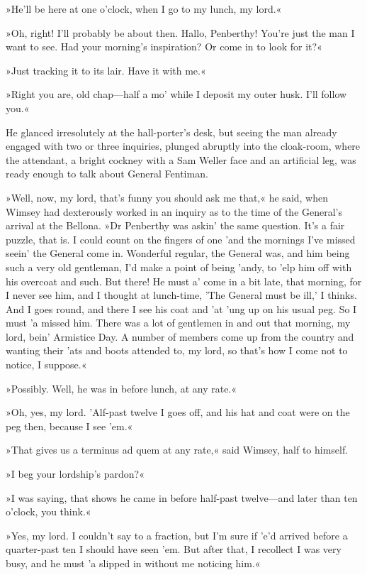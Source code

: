 »He'll be here at one o'clock, when I go to my lunch, my lord.«

»Oh, right! I'll probably be about then. Hallo, Penberthy! You're just the man I want to see. Had your morning's inspiration? Or come in to look for it?«

»Just tracking it to its lair. Have it with me.«

»Right you are, old chap\allowbreak---\allowbreak half a mo' while I deposit my outer husk. I'll follow you.«

He glanced irresolutely at the hall-porter's desk, but seeing the man already engaged with two or three inquiries, plunged abruptly into the cloak-room, where the attendant, a bright cockney with a Sam Weller face and an artificial leg, was ready enough to talk about General Fentiman.

»Well, now, my lord, that's funny you should ask me that,« he said, when Wimsey had dexterously worked in an inquiry as to the time of the General's arrival at the Bellona. »Dr Penberthy was askin' the same question. It's a fair puzzle, that is. I could count on the fingers of one 'and the mornings I've missed seein' the General come in. Wonderful regular, the General was, and him being such a very old gentleman, I'd make a point of being 'andy, to 'elp him off with his overcoat and such. But there! He must a' come in a bit late, that morning, for I never see him, and I thought at lunch-time, 'The General must be ill,' I thinks. And I goes round, and there I see his coat and 'at 'ung up on his usual peg. So I must 'a missed him. There was a lot of gentlemen in and out that morning, my lord, bein' Armistice Day. A number of members come up from the country and wanting their 'ats and boots attended to, my lord, so that's how I come not to notice, I suppose.«

»Possibly. Well, he was in before lunch, at any rate.«

»Oh, yes, my lord. 'Alf-past twelve I goes off, and his hat and coat were on the peg then, because I see 'em.«

»That gives us a terminus ad quem at any rate,« said Wimsey, half to himself.

»I beg your lordship's pardon?«

»I was saying, that shows he came in before half-past twelve\allowbreak---\allowbreak and later than ten o'clock, you think.«

»Yes, my lord. I couldn't say to a fraction, but I'm sure if 'e'd arrived before a quarter-past ten I should have seen 'em. But after that, I recollect I was very busy, and he must 'a slipped in without me noticing him.«

